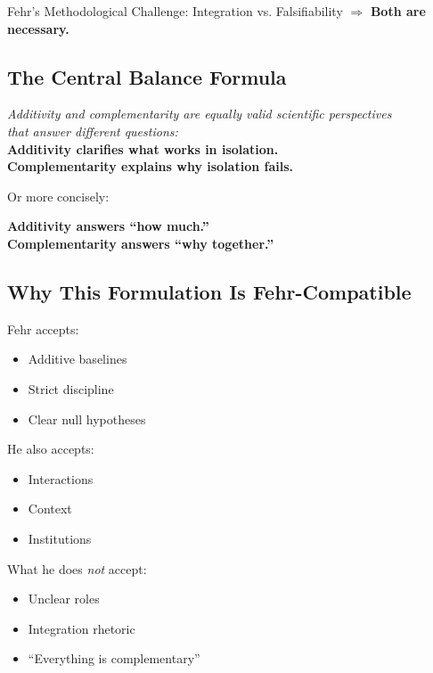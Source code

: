 \begin{chapter}{Fehr's Methodological Challenge: Integration vs. Falsifiability}
$\Rightarrow$ \textbf{Both are necessary.}

\subsection{The Central Balance Formula}

\begin{tcolorbox}[colback=blue!5!white,colframe=blue!75!black]
\begin{center}
\textit{Additivity and complementarity are equally valid scientific perspectives\\
that answer different questions:}\\[0.5em]
\textbf{Additivity clarifies what works in isolation.}\\
\textbf{Complementarity explains why isolation fails.}
\end{center}
\end{tcolorbox}

Or more concisely:

\begin{tcolorbox}[colback=green!5!white,colframe=green!75!black]
\begin{center}
\large
\textbf{Additivity answers ``how much.''}\\
\textbf{Complementarity answers ``why together.''}
\end{center}
\end{tcolorbox}

\subsection{Why This Formulation Is Fehr-Compatible}

Fehr accepts:
\begin{itemize}[noitemsep]
    \item Additive baselines
    \item Strict discipline
    \item Clear null hypotheses
\end{itemize}

He also accepts:
\begin{itemize}[noitemsep]
    \item Interactions
    \item Context
    \item Institutions
\end{itemize}

What he does \textit{not} accept:
\begin{itemize}[noitemsep]
    \item Unclear roles
    \item Integration rhetoric
    \item ``Everything is complementary''
\end{itemize}


\end{chapter}
